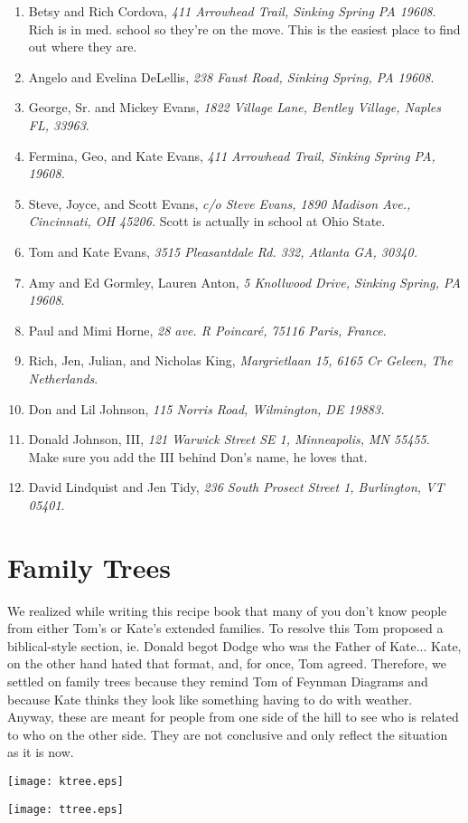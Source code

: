 \documentclass[12pt]{book}
\begin{document}
\begin{enumerate}
\item Betsy and Rich Cordova, \textit{411 Arrowhead Trail, Sinking Spring
PA  19608}.  Rich is in med. school so they're on the move.  This is the
easiest place to find out where they are.
\item Angelo and Evelina DeLellis, \textit{238 Faust Road,
Sinking Spring, PA 19608}.
\item George, Sr. and Mickey Evans, \textit{1822 Village Lane,
Bentley Village, Naples FL, 33963}.
\item Fermina, Geo, and Kate Evans, \textit{411 Arrowhead Trail, 
Sinking Spring PA, 19608.}
\item Steve, Joyce, and Scott Evans, \textit{c/o Steve Evans, 1890 Madison
 Ave., Cincinnati, OH 45206.} Scott is actually in school at Ohio State.
\item Tom and Kate Evans, \textit{3515 Pleasantdale Rd. 332, 
Atlanta GA, 30340.}
\item Amy and Ed Gormley, Lauren Anton, \textit{5 Knollwood Drive,
Sinking Spring, PA 19608}.
\item Paul and Mimi Horne, \textit{28 ave. R Poincar\'{e}, 75116
Paris, France}.
\item Rich, Jen, Julian, and Nicholas King, \textit{Margrietlaan 15,
6165 Cr Geleen, The Netherlands}.
\item Don and Lil Johnson, \textit{115 Norris Road,
Wilmington, DE 19883.}
\item Donald Johnson, III, \textit{121 Warwick Street SE 1, 
Minneapolis, MN 55455}.  Make sure you add the
III behind Don's name, he loves that.
\item David Lindquist and Jen Tidy, \textit{236 South Prosect Street 1,
Burlington, VT  05401}.
\end{enumerate}

\section{Family Trees}

We realized while writing this recipe book that many of you don't know
people from either Tom's or Kate's extended families.  To resolve this
Tom proposed a biblical-style section, ie. Donald begot Dodge who was the
Father of Kate...  Kate, on the other hand hated that format, and, for
once, Tom agreed.  Therefore, we settled on family trees because they
remind Tom of Feynman Diagrams and because Kate thinks they look like
something having to do with weather.  Anyway, these are meant for people
from one side of the hill to see who is related to who on the other side.
They are not conclusive and only reflect the situation as it is now.
\vspace*{\fill}
\pagebreak
\begin{center}
\texttt{[image: ktree.eps]}
\end{center}
\pagebreak
\centerline{
\texttt{[image: ttree.eps]}}

\printindex
\end{document}
